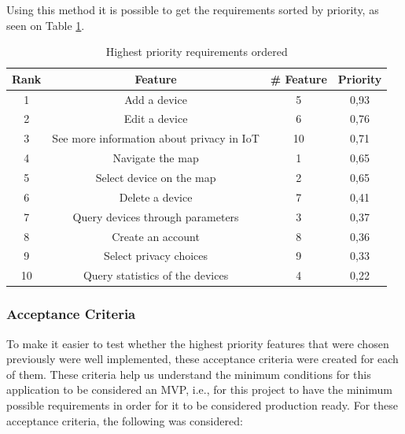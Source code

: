 Using this method it is possible to get the requirements sorted by priority,
as seen on Table \ref{table:sorted requirements}.

\begin{table}[H]
    \centering
    \begin{tabular}{|c|c|c|c|}
        \hline
        \rowcolor{gray!50}
        \textbf{Rank} & \textbf{Feature} & \textbf{\# Feature} & \textbf{Priority} \\
        \hline
        1 & Add a device & 5 & 0,93 \\
        \hline
        2 & Edit a device & 6 & 0,76 \\
        \hline
        3 & See more information about privacy in IoT & 10 & 0,71 \\
        \hline
        4 & Navigate the map & 1 & 0,65 \\
        \hline
        5 & Select device on the map & 2 & 0,65 \\
        \hline
        6 & Delete a device & 7 & 0,41 \\
        \hline
        7 & Query devices through parameters & 3 & 0,37 \\
        \hline
        8 & Create an account & 8 & 0,36 \\
        \hline
        9 & Select privacy choices & 9 & 0,33 \\
        \hline
        10 & Query statistics of the devices & 4 & 0,22 \\
        \hline
    \end{tabular}
    \vspace{1em}
    \caption{Highest priority requirements ordered}
    \label{table:sorted requirements}
\end{table}

\subsubsection{Acceptance Criteria}

To make it easier to test whether the highest priority features that were chosen
previously were well implemented, these acceptance criteria were created for each
of them. These criteria help us understand the minimum conditions for this
application to be considered an MVP, i.e., for this project to have the minimum
possible requirements in order for it to be considered production ready.
\newline
For these acceptance criteria, the following was considered:

